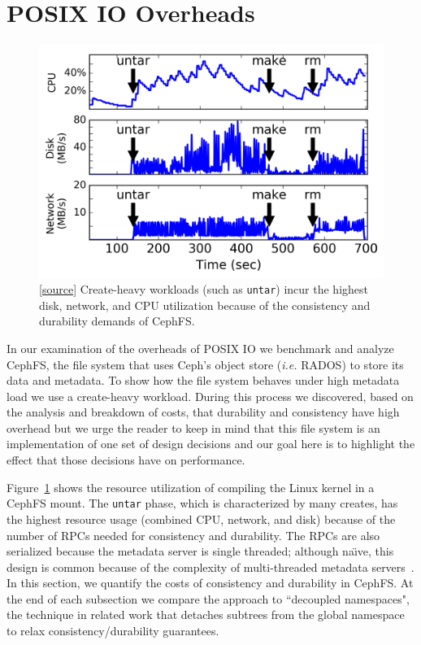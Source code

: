 \section{POSIX IO Overheads}
\label{sec:posix-overheads}

\begin{figure}[tb]
\centering
\includegraphics[width=1\linewidth]{./graphs/overhead-creates.png}
\caption{[\href{https://github.com/michaelsevilla/cudele-popper/blob/revision/experiments/baseline-compile/visualize/viz.ipynb}{source}]
Create-heavy workloads (such as \texttt{untar}) incur the highest disk,
network, and CPU utilization because of the consistency and durability demands
of CephFS.}\label{fig:overhead-creates}
\end{figure}

In our examination of the overheads of POSIX IO we benchmark and analyze
CephFS, the file system that uses Ceph's object store ({\it i.e.} RADOS) to
store its data and metadata. To show how the file system behaves under high
metadata load we use a create-heavy workload.  During this process we
discovered, based on the analysis and breakdown of costs, that durability and
consistency have high overhead but we urge the reader to keep in mind that this
file system is an implementation of one set of design decisions and our goal
here is to highlight the effect that those decisions have on performance.

Figure~\ref{fig:overhead-creates} shows the resource utilization of compiling
the Linux kernel in a CephFS mount.  The \texttt{untar} phase, which is
characterized by many creates, has the highest resource usage (combined CPU,
network, and disk) because of the number of RPCs needed for consistency and
durability. The RPCs are also serialized because the metadata server is single
threaded; although na\"{\i}ve, this design is common because of the complexity
of multi-threaded metadata
servers~\cite{konstantinos:pdsw2014-lustre-metadata}.  In this section, we
quantify the costs of consistency and durability in CephFS.  At the end of each
subsection we compare the approach to ``decoupled namespaces", the technique in
related work that detaches subtrees from the global namespace to relax
consistency/durability guarantees. 

